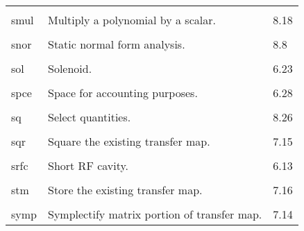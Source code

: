 \begin{center}
\begin{tabular}{lll}
\vspace{-3mm}& &\\
\hspace{1.5em}smul    &  Multiply a polynomial by a scalar.   & \hspace{2em}8.18\\
\vspace{-3mm}& &\\
\hspace{1.5em}snor    &  Static normal form analysis.   &  \hspace{2em}8.8\\
\vspace{-3mm}& &\\
\hspace{1.5em}sol    &    Solenoid.             &  \hspace{2em}6.23\\
\vspace{-3mm}& &\\
\hspace{1.5em}spce    &   Space for accounting purposes.   &  \hspace{2em}6.28\\
\vspace{-3mm}& &\\
\hspace{1.5em}sq      &   Select quantities.       &      \hspace{2em}8.26\\
\vspace{-3mm}& &\\
\hspace{1.5em}sqr   &    Square the existing transfer map.   & \hspace{2em}7.15\\
\vspace{-3mm}& &\\
\hspace{1.5em}srfc    &    Short RF cavity.           &  \hspace{2em}6.13\\
\vspace{-3mm}& &\\
\hspace{1.5em}stm   &   Store the existing transfer map.    & \hspace{2em}7.16\\
\vspace{-3mm}& &\\
\hspace{1.5em}symp & Symplectify matrix portion of transfer map. & \hspace{2em}7.14\\

\end{tabular}
\end{center}
